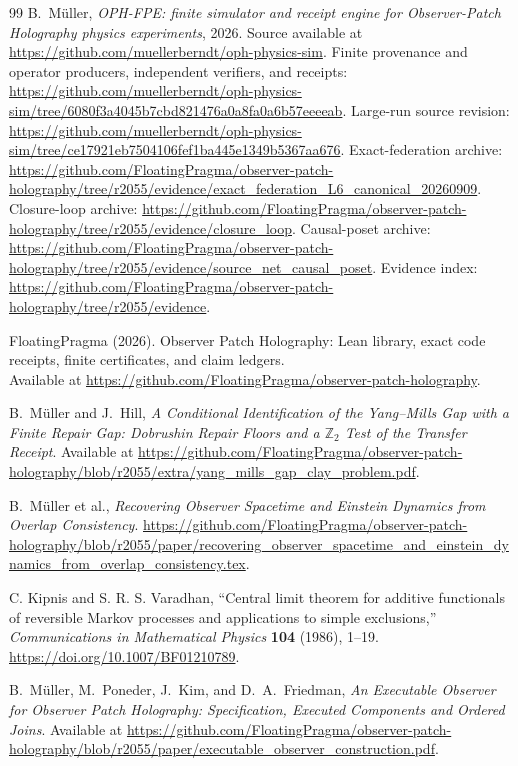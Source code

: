 \documentclass[11pt]{article}
\theoremstyle{remark}
\theoremstyle{plain}
\begin{document}
\begin{thebibliography}{99}
B.\ M\"uller,
\emph{OPH-FPE: finite simulator and receipt engine for Observer-Patch
Holography physics experiments},
2026.
Source available at \url{https://github.com/muellerberndt/oph-physics-sim}.
Finite provenance and operator producers, independent verifiers, and receipts:
\url{https://github.com/muellerberndt/oph-physics-sim/tree/6080f3a4045b7cbd821476a0a8fa0a6b57eeeeab}.
Large-run source revision:
\url{https://github.com/muellerberndt/oph-physics-sim/tree/ce17921eb7504106fef1ba445e1349b5367aa676}.
Exact-federation archive:
\url{https://github.com/FloatingPragma/observer-patch-holography/tree/r2055/evidence/exact_federation_L6_canonical_20260909}.
Closure-loop archive:
\url{https://github.com/FloatingPragma/observer-patch-holography/tree/r2055/evidence/closure_loop}.
Causal-poset archive:
\url{https://github.com/FloatingPragma/observer-patch-holography/tree/r2055/evidence/source_net_causal_poset}.
Evidence index:
\url{https://github.com/FloatingPragma/observer-patch-holography/tree/r2055/evidence}.

FloatingPragma (2026). Observer Patch Holography: Lean library, exact code
receipts, finite certificates, and claim ledgers.\\
Available at \url{https://github.com/FloatingPragma/observer-patch-holography}.

B.\ M\"uller and J.\ Hill,
\emph{A Conditional Identification of the Yang--Mills Gap with a Finite Repair Gap: Dobrushin Repair Floors and a \(\mathbb Z_2\) Test of the Transfer Receipt}.
Available at \url{https://github.com/FloatingPragma/observer-patch-holography/blob/r2055/extra/yang_mills_gap_clay_problem.pdf}.

B.~M\"uller et al.,
\emph{Recovering Observer Spacetime and Einstein Dynamics from Overlap Consistency}.
\url{https://github.com/FloatingPragma/observer-patch-holography/blob/r2055/paper/recovering_observer_spacetime_and_einstein_dynamics_from_overlap_consistency.tex}.

C. Kipnis and S. R. S. Varadhan,
``Central limit theorem for additive functionals of reversible Markov
processes and applications to simple exclusions,''
\emph{Communications in Mathematical Physics} \textbf{104} (1986), 1--19.
\url{https://doi.org/10.1007/BF01210789}.

B.~M\"uller, M.~Poneder, J.~Kim, and D.~A.~Friedman,
\emph{An Executable Observer for Observer Patch Holography: Specification, Executed Components and Ordered Joins}.
Available at \url{https://github.com/FloatingPragma/observer-patch-holography/blob/r2055/paper/executable_observer_construction.pdf}.


\end{thebibliography}
\end{document}
